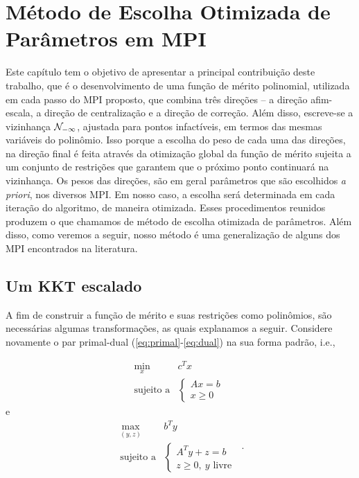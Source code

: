 





	\chapter{Método de Escolha Otimizada de Parâmetros em \ac{MPI}}
\label{chap:merit-function}


Este capítulo tem o objetivo de apresentar a principal contribuição deste trabalho, que é o desenvolvimento de uma função de mérito polinomial,  utilizada em cada passo do \acl{MPI} proposto,  que combina três direções -- a direção afim-escala, a direção de centralização e a direção de correção. Além disso, escreve-se a vizinhança $\mathcal{N}_{-\infty}$, ajustada para pontos infactíveis, em termos das mesmas variáveis do polinômio. Isso porque a escolha do peso de cada uma das direções,  na direção final é feita através da  otimização global da função de mérito sujeita a um conjunto de restrições que garantem que o próximo ponto continuará na vizinhança. Os pesos das direções, são em geral parâmetros que são escolhidos  \emph{a priori}, nos diversos \ac{MPI}.  Em nosso caso, a escolha será determinada em cada iteração do algoritmo, de maneira otimizada.  Esses procedimentos reunidos produzem o que chamamos de   método de escolha otimizada de parâmetros. Além disso, como veremos a seguir,  nosso método é uma generalização de alguns dos \ac{MPI} encontrados na literatura. 

\section{Um KKT escalado}


 
A fim de construir a função de mérito e suas restrições como polinômios, são necessárias algumas transformações, as quais explanamos a seguir. Considere novamente o par primal-dual  (\ref{eq:primal}-\ref{eq:dual}) na sua forma padrão,
i.e.,  

 \begin{equation*}
	\begin{array}{lc}
\displaystyle \min_{x} & c^Tx \\
\text{sujeito a} &\begin{cases} Ax = b \\
				 x \geq 0	
				 \end{cases}\
\end{array}\tag{$P$}
\end{equation*}
e 
 \begin{equation}
	\begin{array}{lc}
\displaystyle \max_{(y,z)} & b^Ty \\
\text{sujeito a} &\begin{cases} A^Ty + z = b \\
				 z \geq 0, \:y \text{ livre}	
				 \end{cases}\
\end{array}.
\tag{$D$}
\end{equation}

